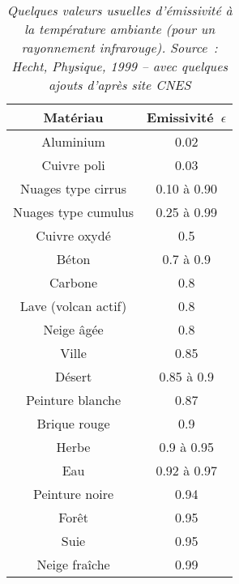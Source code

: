\begin{table}\label{tab:emiss}
\begin{center}
\begin{tabular}{|c|c|}
\hline
Matériau & Emissivité~$\epsilon$ \\
\hline
Aluminium & 0.02 \\
Cuivre poli & 0.03 \\
Nuages type cirrus & 0.10 à 0.90 \\
Nuages type cumulus & 0.25 à 0.99 \\
Cuivre oxydé & 0.5 \\
Béton & 0.7 à 0.9 \\
Carbone & 0.8 \\
Lave (volcan actif) & 0.8 \\
Neige âgée & 0.8 \\
Ville & 0.85 \\
Désert & 0.85 à 0.9 \\
Peinture blanche & 0.87 \\
Brique rouge & 0.9 \\
Herbe & 0.9 à 0.95 \\
Eau & 0.92 à 0.97 \\
Peinture noire & 0.94 \\
Forêt & 0.95 \\
Suie & 0.95 \\
Neige fraîche & 0.99 \\
\hline
\end{tabular}
\caption{\emph{Quelques valeurs usuelles d'émissivité à la température ambiante (pour un rayonnement infrarouge). Source~: Hecht, Physique, 1999 -- avec quelques ajouts d'après site CNES}}
\end{center}
\end{table}
